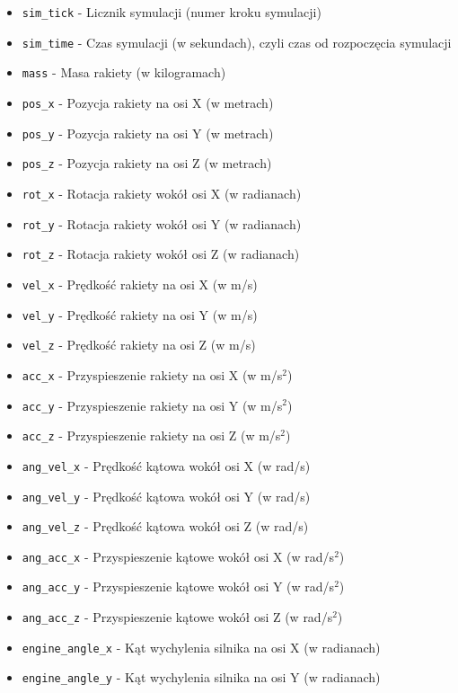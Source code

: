 \begin{itemize}
    \item \texttt{sim\_tick} - Licznik symulacji (numer kroku symulacji)
    \item \texttt{sim\_time} - Czas symulacji (w sekundach), czyli czas od rozpoczęcia symulacji
    \item \texttt{mass} - Masa rakiety (w kilogramach)
    \item \texttt{pos\_x} - Pozycja rakiety na osi X (w metrach)
    \item \texttt{pos\_y} - Pozycja rakiety na osi Y (w metrach)
    \item \texttt{pos\_z} - Pozycja rakiety na osi Z (w metrach)
    \item \texttt{rot\_x} - Rotacja rakiety wokół osi X (w radianach)
    \item \texttt{rot\_y} - Rotacja rakiety wokół osi Y (w radianach)
    \item \texttt{rot\_z} - Rotacja rakiety wokół osi Z (w radianach)
    \item \texttt{vel\_x} - Prędkość rakiety na osi X (w m/s)
    \item \texttt{vel\_y} - Prędkość rakiety na osi Y (w m/s)
    \item \texttt{vel\_z} - Prędkość rakiety na osi Z (w m/s)
    \item \texttt{acc\_x} - Przyspieszenie rakiety na osi X (w m/s\(^2\))
    \item \texttt{acc\_y} - Przyspieszenie rakiety na osi Y (w m/s\(^2\))
    \item \texttt{acc\_z} - Przyspieszenie rakiety na osi Z (w m/s\(^2\))
    \item \texttt{ang\_vel\_x} - Prędkość kątowa wokół osi X (w rad/s)
    \item \texttt{ang\_vel\_y} - Prędkość kątowa wokół osi Y (w rad/s)
    \item \texttt{ang\_vel\_z} - Prędkość kątowa wokół osi Z (w rad/s)
    \item \texttt{ang\_acc\_x} - Przyspieszenie kątowe wokół osi X (w rad/s\(^2\))
    \item \texttt{ang\_acc\_y} - Przyspieszenie kątowe wokół osi Y (w rad/s\(^2\))
    \item \texttt{ang\_acc\_z} - Przyspieszenie kątowe wokół osi Z (w rad/s\(^2\))
    \item \texttt{engine\_angle\_x} - Kąt wychylenia silnika na osi X (w radianach)
    \item \texttt{engine\_angle\_y} - Kąt wychylenia silnika na osi Y (w radianach)
\end{itemize}

